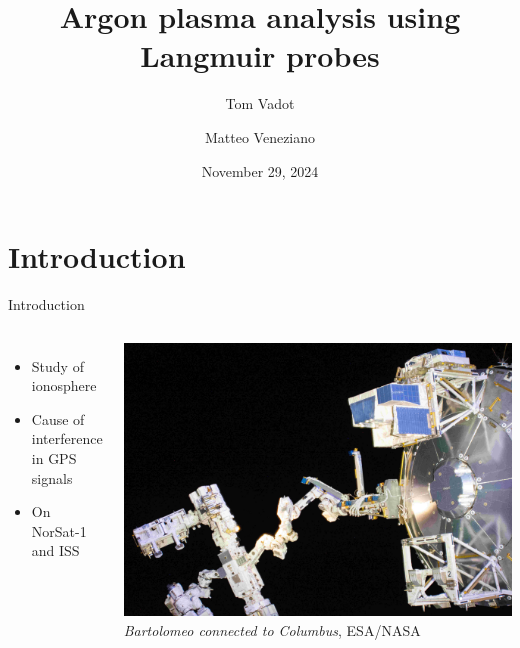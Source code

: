 \documentclass[10pt]{beamer}
\title{Argon plasma analysis using Langmuir probes}
\author{Tom Vadot \and Matteo Veneziano}
\institute{EPFL Section of Physics}
\date{November 29, 2024}
\begin{document}
\begin{frame}[plain]
    \titlepage
\end{frame}

\section{Introduction}

\begin{frame}[t]{Introduction}
    \begin{columns}
        \begin{itemize}
            \item Study of ionosphere
            \item Cause of interference in GPS signals \, 
            \item On NorSat-1 \,  and ISS \, 
        \end{itemize}

        \centering
        \includegraphics[width=\textwidth]{../figures/bartolomeo.jpg}
        \small{\emph{Bartolomeo connected to Columbus}, ESA/NASA}
    \end{columns}
\end{frame}
\end{document}
